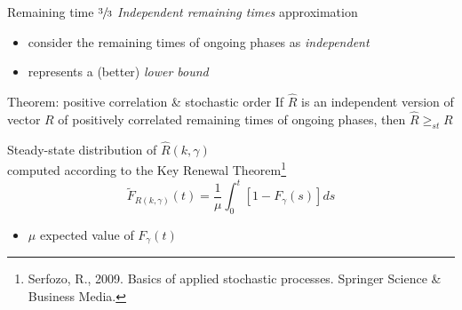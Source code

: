     \begin{frame}{Remaining time}
      $\sfrac{3}{3}$ \textit{Independent remaining times} approximation
      \begin{itemize}
        \item consider the remaining times of ongoing phases as \textit{independent}
        \item represents a (better) \textit{lower bound}
      \end{itemize}
      
      \begin{block}{Theorem: positive correlation \& stochastic order}
        If $\hat{R}$ is an independent version of vector $R$ of positively correlated remaining times of ongoing phases, then $\hat{R} \geq_{st} R$
      \end{block}
      
      \vspace{1em}
      Steady-state distribution of $\hat{R}(k,\gamma)$\\
      computed according to the Key Renewal Theorem\footnote{\scriptsize Serfozo, R., 2009. Basics of applied stochastic processes. Springer Science \& Business Media.}
      \begin{equation*}
        \tilde{F}_{R(k,\gamma)}(t) = \frac{1}{\mu} \int_{0}^{t} [1 - F_{\gamma}(s)]ds
      \end{equation*}
      \begin{itemize}
        \item $\mu$ expected value of $F_{\gamma}(t)$
      \end{itemize}
    \end{frame}
    
